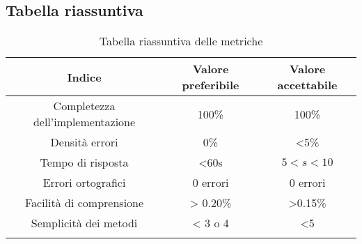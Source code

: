 \subsection{Tabella riassuntiva}
		\begin{center}
		\begin{longtable}{|c|c|c|}
			\hline
			\rowcolor{lighter-grayer}
			\textbf{Indice} & \textbf{Valore preferibile} & \textbf{Valore accettabile}  \\ 
						
			\hline
			\endhead
			
			\hline
			Completezza dell'implementazione & 100\% & 100\% \\
			\hline
			Densità errori & 0\% & <5\% \\
			\hline
			Tempo di risposta & <60s & $5 < s < 10$ \\
			\hline
			Errori ortografici & 0 errori & 0 errori \\
			\hline
			Facilità di comprensione & > 0.20\% & >0.15\% \\
			\hline
			Semplicità dei metodi & < 3 o 4 & <5 \\
			\hline
				
			\hiderowcolors
			\caption{Tabella riassuntiva delle metriche }		
		\end{longtable}	
	\end{center}
 

